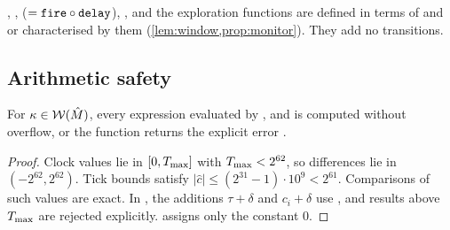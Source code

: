 \begin{remark}
, , 
($=\texttt{fire}\circ\texttt{delay}$), ,  and the
exploration functions are defined in terms of  and  or
characterised by them (\cref{lem:window,prop:monitor}). They add no transitions.
\end{remark}

\subsection{Arithmetic safety}

\begin{lemma}[No overflow]\label{lem:overflow}
For $\kappa\in\mathcal{W}(\hat M)$, every  expression evaluated by
,  and  is computed without overflow,
or the function returns the explicit error .
\end{lemma}
\begin{proof}
Clock values lie in $[0,T_{\max}]$ with $T_{\max}<2^{62}$, so differences lie in
$(-2^{62},2^{62})$. Tick bounds satisfy $|\hat c|\le(2^{31}-1)\cdot10^9<2^{61}$.
Comparisons of such values are exact. In , the additions $\tau+\delta$
and $c_i+\delta$ use , and results above $T_{\max}$ are
rejected explicitly.  assigns only the constant $0$.
\end{proof}
